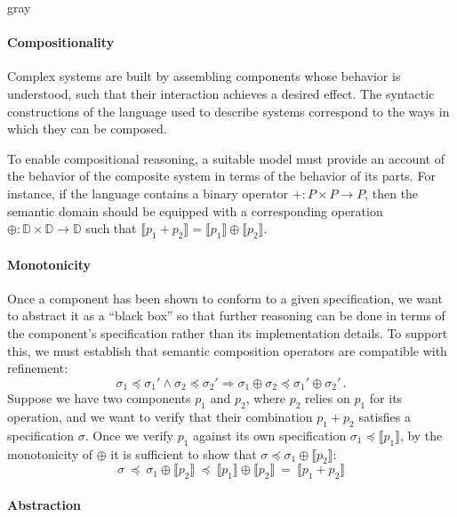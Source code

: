 \documentclass[sigplan,10pt,review]{acmart}
\newcommand{\refby}{\preceq}
\newenvironment{optional}{\begin{color}{gray}}{\end{color}}
\begin{document}
\begin{optional}

\paragraph{Compositionality} %

Complex systems are built by assembling components
whose behavior is understood,
such that their interaction achieves a desired effect.
The syntactic constructions of
the language used to describe systems
correspond to the ways in which they can be composed.

To enable compositional reasoning,
a suitable model must provide an account of
the behavior of the composite system
in terms of the behavior of its parts.
For instance,
if the language contains a binary operator
${+} : P \times P \rightarrow P$,
then the semantic domain should be equipped with
a corresponding operation
${\oplus} : \mathbb{D} \times \mathbb{D} \rightarrow \mathbb{D}$
such that
$\llbracket p_1 + p_2 \rrbracket =
 \llbracket p_1 \rrbracket \oplus \llbracket p_2 \rrbracket$.


\paragraph{Monotonicity} %

Once a component has been shown to conform to a given specification,
we want to abstract it as a ``black box''
so that further reasoning can be done in terms of
the component's specification rather than its implementation details.
To support this,
we must establish that semantic composition operators
are compatible with refinement:
\[ \sigma_1 \refby \sigma_1' \wedge
   \sigma_2 \refby \sigma_2' \Rightarrow
   \sigma_1 \oplus \sigma_2 \refby \sigma_1' \oplus \sigma_2' \,. \]
Suppose we have two components $p_1$ and $p_2$,
where $p_2$ relies on $p_1$ for its operation,
and we want to verify that their combination $p_1 + p_2$
satisfies a specification $\sigma$.
Once we verify $p_1$ against its own specification
$\sigma_1 \refby \llbracket p_1 \rrbracket$,
by the monotonicity of ${\oplus}$ it is sufficient to show that
$\sigma \refby \sigma_1 \oplus \llbracket p_2 \rrbracket$:
\[
   \sigma \:\refby\:
   \sigma_1 \oplus \llbracket p_2 \rrbracket \:\refby\:
   \llbracket p_1 \rrbracket \oplus \llbracket p_2 \rrbracket \:=\:
   \llbracket p_1 + p_2 \rrbracket
\]


\paragraph{Abstraction} %


\end{optional}
\end{document}
